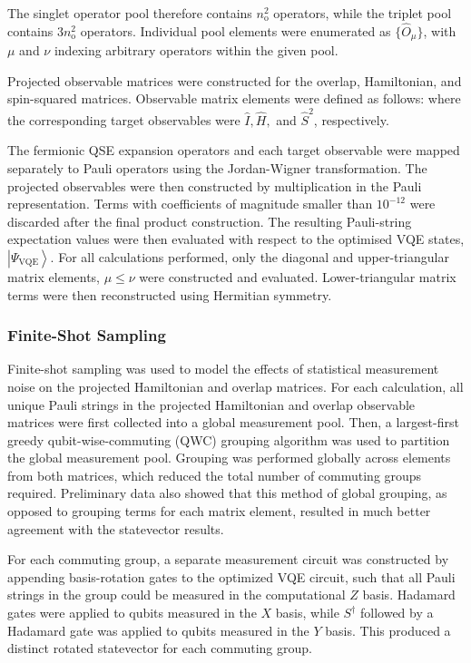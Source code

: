 The singlet operator pool therefore contains $n_{\mathrm{o}}^2$
operators, while the triplet pool contains
$3n_{\mathrm{o}}^2$ operators. Individual pool elements were enumerated as
$\{\hat{O}_\mu\}$, with $\mu$ and $\nu$ indexing arbitrary operators within the given pool.

Projected observable matrices were constructed for the overlap, Hamiltonian, and spin-squared matrices. Observable matrix elements were defined as follows: 
\QSEProjectedObservablesEquation
where the corresponding target observables were $\hat I, \hat H,$ and $\hat S^{2}$, respectively.

The fermionic QSE expansion operators and each target observable were mapped separately to Pauli operators using the Jordan-Wigner transformation. The projected observables were then constructed by multiplication in the Pauli representation. Terms with coefficients of magnitude smaller than $10^{-12}$ were discarded after the final product construction. 
The resulting Pauli-string expectation values were then evaluated with respect to the optimised VQE states, $\left|\Psi_{\mathrm{VQE}}\right\rangle$.
For all calculations performed, only the diagonal and upper-triangular matrix elements, $\mu \leq \nu$ were constructed and evaluated. Lower-triangular matrix terms were then reconstructed using Hermitian symmetry.


\subsubsection{Finite-Shot Sampling}
Finite-shot sampling was used to model the effects of statistical measurement noise on the projected Hamiltonian and overlap matrices. 
For each calculation, all unique Pauli strings in the projected Hamiltonian and overlap observable matrices were first collected into a global measurement pool. Then, a largest-first greedy qubit-wise-commuting (QWC) grouping algorithm was used to partition the global measurement pool. 
Grouping was performed globally across elements from both matrices, which reduced the total number of commuting groups required. Preliminary data also showed that this method of global grouping, as opposed to grouping terms for each matrix element, resulted in much better agreement with the statevector results. 

For each commuting group, a separate measurement circuit was constructed by appending basis-rotation gates to the optimized VQE circuit, such that all Pauli strings in the group could be measured in the computational $Z$ basis. Hadamard gates were applied to qubits measured in the $X$ basis, while $S^{\dagger}$ followed by a Hadamard gate was applied to qubits measured in the $Y$ basis. This produced a distinct rotated statevector for each commuting group.

